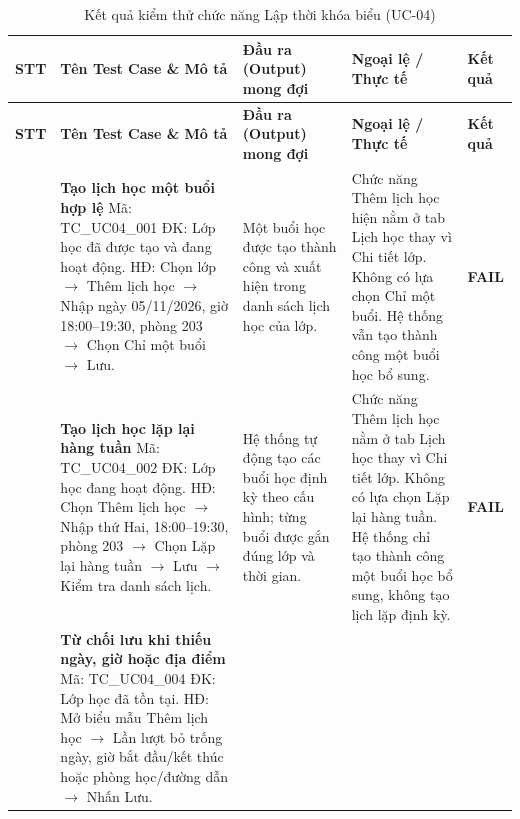 \vspace{0.4em}
\begin{longtable}{|>{\centering\arraybackslash}p{0.8cm}|>{\raggedright\arraybackslash}p{4.6cm}|>{\raggedright\arraybackslash}p{3.8cm}|>{\raggedright\arraybackslash}p{3.8cm}|>{\centering\arraybackslash}p{1.5cm}|}
\caption{Kết quả kiểm thử chức năng Lập thời khóa biểu (UC-04)}\label{tab:test-uc04}\\
\hline
\textbf{STT} & \textbf{Tên Test Case \& Mô tả} & \textbf{Đầu ra (Output) mong đợi} & \textbf{Ngoại lệ / Thực tế} & \textbf{Kết quả} \\
\hline
\endfirsthead
\hline
\textbf{STT} & \textbf{Tên Test Case \& Mô tả} & \textbf{Đầu ra (Output) mong đợi} & \textbf{Ngoại lệ / Thực tế} & \textbf{Kết quả} \\
\hline
\endhead
1 & \textbf{Tạo lịch học một buổi hợp lệ}\newline
Mã: TC\_UC04\_001\newline
ĐK: Lớp học đã được tạo và đang hoạt động.\newline
HĐ: Chọn lớp $\rightarrow$ Thêm lịch học $\rightarrow$ Nhập ngày 05/11/2026, giờ 18:00--19:30, phòng 203 $\rightarrow$ Chọn Chỉ một buổi $\rightarrow$ Lưu. &
Một buổi học được tạo thành công và xuất hiện trong danh sách lịch học của lớp. &
Chức năng Thêm lịch học hiện nằm ở tab Lịch học thay vì Chi tiết lớp. Không có lựa chọn Chỉ một buổi. Hệ thống vẫn tạo thành công một buổi học bổ sung. & \textbf{FAIL} \\
\hline
2 & \textbf{Tạo lịch học lặp lại hàng tuần}\newline
Mã: TC\_UC04\_002\newline
ĐK: Lớp học đang hoạt động.\newline
HĐ: Chọn Thêm lịch học $\rightarrow$ Nhập thứ Hai, 18:00--19:30, phòng 203 $\rightarrow$ Chọn Lặp lại hàng tuần $\rightarrow$ Lưu $\rightarrow$ Kiểm tra danh sách lịch. &
Hệ thống tự động tạo các buổi học định kỳ theo cấu hình; từng buổi được gắn đúng lớp và thời gian. &
Chức năng Thêm lịch học nằm ở tab Lịch học thay vì Chi tiết lớp. Không có lựa chọn Lặp lại hàng tuần. Hệ thống chỉ tạo thành công một buổi học bổ sung, không tạo lịch lặp định kỳ. & \textbf{FAIL} \\
\hline
3 & \textbf{Từ chối lưu khi thiếu ngày, giờ hoặc địa điểm}\newline
Mã: TC\_UC04\_004\newline
ĐK: Lớp học đã tồn tại.\newline
HĐ: Mở biểu mẫu Thêm lịch học $\rightarrow$ Lần lượt bỏ trống ngày, giờ bắt đầu/kết thúc hoặc phòng học/đường dẫn $\rightarrow$ Nhấn Lưu. &

\end{longtable}
